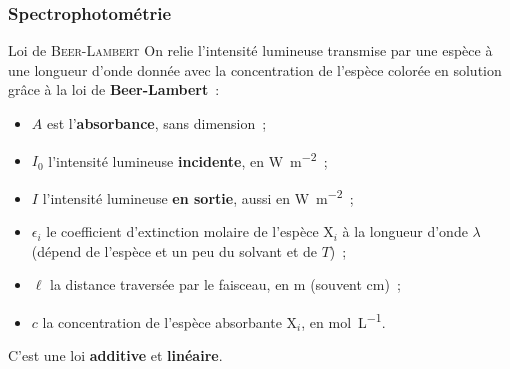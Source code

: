 \documentclass[../main/main.tex]{subfiles}
\begin{document}
\subsubsection{Spectrophotométrie}
\begin{loi}[label=loi:berrlambert]{Loi de \textsc{Beer-Lambert}}
    On relie l'intensité lumineuse transmise par une espèce à une longueur
    d'onde donnée avec la concentration de l'espèce colorée en solution grâce à
    la loi de \textbf{Beer-Lambert}~:
    \vspace{-12pt}
    \begin{itemize}
        \item $A$ est l'\textbf{absorbance}, sans dimension~;
        \item $I_0$ l'intensité lumineuse \textbf{incidente}, en \si{W.m^{-2}}~;
        \item $I$ l'intensité lumineuse \textbf{en sortie}, aussi en
            \si{W.m^{-2}}~;
        \item $\epsilon_i$ le coefficient d'extinction molaire de l'espèce X$_i$
            à la longueur d'onde $\lambda$ (dépend de l'espèce et un peu du
            solvant et de $T$)~;
        \item $\ell$ la distance traversée par le faisceau, en \si{m} (souvent
            \si{cm})~;
        \item $c$ la concentration de l'espèce absorbante X$_i$, en
            \si{mol.L^{-1}}.
    \end{itemize}
    \begin{center}
        C'est une loi \textbf{additive} et \textbf{linéaire}.
    \end{center}
\end{loi}
\end{document}

